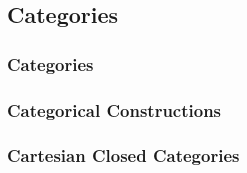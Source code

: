 \subsection{Categories}
\subsubsection{Categories}
\subsubsection{Categorical Constructions}
\subsubsection{Cartesian Closed Categories}